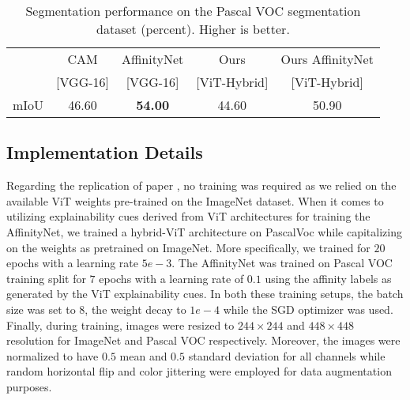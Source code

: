 \begin{table}[!h]
\centering \begin{adjustbox}{width=0.9\textwidth} \small
    \begin{tabular*}{\linewidth}{@{\extracolsep{\fill}}lcccc}
        &CAM \cite{zhou2016learning} & AffinityNet \cite{ahn2018learning} & Ours & Ours AffinityNet \\        &[VGG-16] & [VGG-16] & [ViT-Hybrid] & [ViT-Hybrid] \\  
        mIoU & 46.60 & \textbf{54.00} & 44.60 & 50.90\\
    \end{tabular*}
    \end{adjustbox}
    \caption{Segmentation performance on the Pascal VOC segmentation \cite{pascalvoc} dataset (percent). Higher is better.}
    \label{tab:Affinity}
\end{table}


\subsection{Implementation Details}
Regarding the replication of paper \cite{mainpaper}, no training was required as we relied on the available ViT weights pre-trained on the ImageNet dataset. When it comes to utilizing explainability cues derived from ViT architectures for training the AffinityNet, we trained a hybrid-ViT architecture on PascalVoc while capitalizing on the weights as pretrained on ImageNet. More specifically, we trained for $20$ epochs with a learning rate $5e-3$. The AffinityNet was trained on Pascal VOC training split for $7$ epochs with a learning rate of $0.1$ using the affinity labels as generated by the ViT explainability cues. In both these training setups, the batch size was set to $8$, the weight decay to $1e-4$ while the SGD optimizer was used. Finally, during training, images were resized to $244\times244$ and $448\times448$ resolution for ImageNet and Pascal VOC respectively. Moreover, the images were normalized to have $0.5$ mean and $0.5$ standard deviation for all channels while  random horizontal flip and color jittering were employed for data augmentation purposes.

